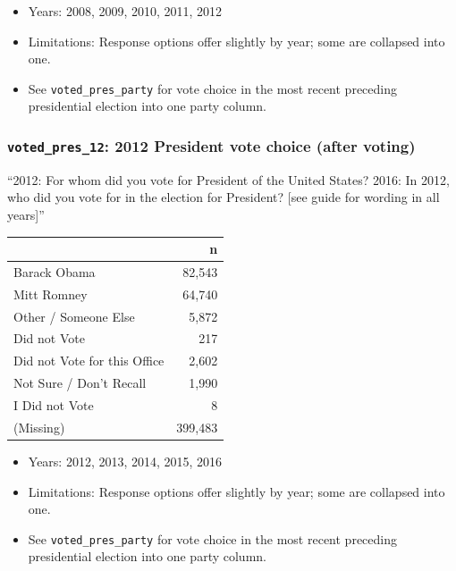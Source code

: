 \documentclass[10pt,article,oneside]{memoir}
\theoremstyle{definition}
\begin{document}
\begin{itemize}
\tightlist
\item
  Years: 2008, 2009, 2010, 2011, 2012
\item
  Limitations: Response options offer slightly by year; some are
  collapsed into one.
\item
  See \texttt{voted\_pres\_party} for vote choice in the most recent
  preceding presidential election into one party column.
\end{itemize}

\hypertarget{voted_pres_12-2012-president-vote-choice-after-voting}{%
\subsubsection{\texorpdfstring{\texttt{voted\_pres\_12}: 2012 President
vote choice (after
voting)}{voted\_pres\_12: 2012 President vote choice (after voting)}}\label{voted_pres_12-2012-president-vote-choice-after-voting}}

``2012: For whom did you vote for President of the United States? 2016:
In 2012, who did you vote for in the election for President? {[}see
guide for wording in all years{]}''

\begin{table}[H]
\centering
\begin{tabular}[t]{lr}
\toprule
 & n\\
\midrule
Barack Obama & 82,543\\
Mitt Romney & 64,740\\
Other / Someone Else & 5,872\\
Did not Vote & 217\\
Did not Vote for this Office & 2,602\\
Not Sure / Don't Recall & 1,990\\
I Did not Vote & 8\\
(Missing) & 399,483\\
\bottomrule
\end{tabular}
\end{table}

\begin{itemize}
\tightlist
\item
  Years: 2012, 2013, 2014, 2015, 2016
\item
  Limitations: Response options offer slightly by year; some are
  collapsed into one.
\item
  See \texttt{voted\_pres\_party} for vote choice in the most recent
  preceding presidential election into one party column.
\end{itemize}
\end{document}
